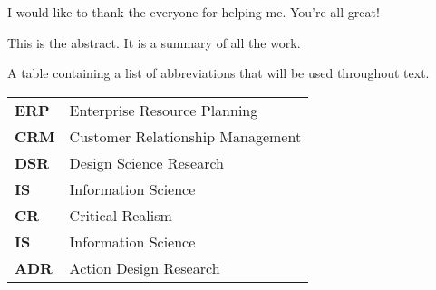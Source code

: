 \documentclass[a4paper,oneside,11pt]{book}
\begin{document}
\CoSupervisor{} 
\AssistantSupervisor{} 

\MakeTitle 

\begin{Acknowledgements}{}
			I would like to thank the everyone for helping me. You're all great!
\end{Acknowledgements}

\begin{Abstract}{}
			This is the abstract. It is a summary of all the work.
\end{Abstract}

\MakeTOCandLOFandLOT %

\begin{TableOfAbbrev}
			A table containing a list of abbreviations that will be used throughout text.
			\begin{table}[!htpb!]%
			\begin{tabular}{ll}
			\textbf{ERP} & Enterprise Resource Planning\\
                \textbf{CRM} & Customer Relationship Management\\
                \textbf{DSR} & Design Science Research\\
                \textbf{IS} & Information Science\\
                \textbf{CR} & Critical Realism\\
				\textbf{IS} & Information Science\\
                \textbf{ADR} & Action Design Research\\
			\end{tabular}
			\end{table}
\end{TableOfAbbrev}
\end{document}
